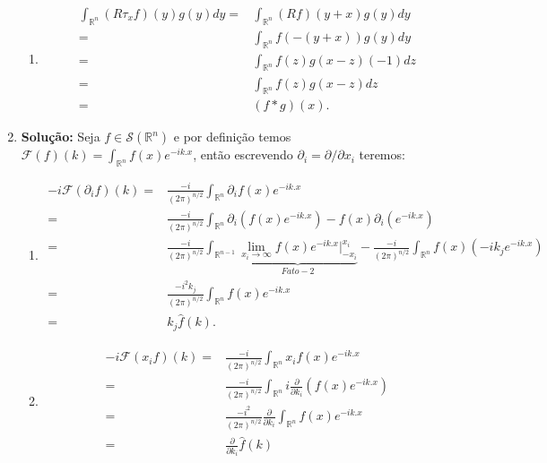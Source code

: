 \documentclass{article}
\begin{document}
\begin{enumerate}
\begin{enumerate}
				\item
				$$
				\begin{aligned}
				\int_{\mathbb{R}^{n}} (R\tau_{x}f)(y)g(y)dy = & \int_{\mathbb{R}^{n}} (Rf)(y+x)g(y)dy
				\\ = & \int_{\mathbb{R}^{n}} f(-(y+x))g(y)dy
				\\ = & \int_{\mathbb{R}^{n}} f(z)g(x-z)(-1)dz
				\\ = & \int_{\mathbb{R}^{n}} f(z)g(x-z)dz
				\\ = & (f*g)(x).
				\end{aligned}
				$$
			\end{enumerate}
		\item \textbf{Solução:} Seja $f \in \mathcal{S}(\mathbb{R}^{n})$ e por definição temos $\mathcal{F}(f)(k) = \int_{\mathbb{R}^{n}} f(x)e^{-ik.x}$, então escrevendo $\partial_{i} = \partial/\partial x_{i}$ teremos:
			\begin{enumerate}
				\item 
				$$
				\begin{aligned}
				-i\mathcal{F}(\partial_{i}f)(k) = & \frac{-i}{(2\pi)^{n/2}}\int_{\mathbb{R}^{n}} \partial_{i}f(x)e^{-ik.x}
				\\
				= & \frac{-i}{(2\pi)^{n/2}}\int_{\mathbb{R}^{n}} \partial_{i}( f(x)e^{-ik.x} ) - f(x)\partial_{i}(e^{-ik.x})
				\\
				= & \frac{-i}{(2\pi)^{n/2}}\int_{\mathbb{R}^{n-1}} \underbrace{ \lim_{x_{i} \to \infty} f(x)e^{-ik.x} \Big|^{x_{i}}_{-x_{i}} }_{Fato-2} - \frac{-i}{(2\pi)^{n/2}}\int_{\mathbb{R}^{n}}  f(x) (-ik_{j}e^{-ik.x})
				\\
				= & \frac{-i^{2}k_{j}}{(2\pi)^{n/2}}\int_{\mathbb{R}^{n}}  f(x) e^{-ik.x}
				\\
				= & k_{j}\hat{f}(k).	
				\end{aligned}
				$$
				
				\item
				$$
				\begin{aligned}
				-i\mathcal{F}(x_{i}f)(k) = & \frac{-i}{(2\pi)^{n/2}}\int_{\mathbb{R}^{n}} x_{i}f(x)e^{-ik.x}
				\\
				= & \frac{-i}{(2\pi)^{n/2}}\int_{\mathbb{R}^{n}} i\frac{\partial}{\partial k_{i}}( f(x)e^{-ik.x} )
				\\
				= & \frac{-i^{2}}{(2\pi)^{n/2}} \frac{\partial}{\partial k_{i}}\int_{\mathbb{R}^{n}} f(x)e^{-ik.x}
				\\
				= & \frac{\partial}{\partial k_{i}}\hat{f}(k)
				\end{aligned}
				$$
			\end{enumerate}
		

\end{enumerate}
\end{document}
